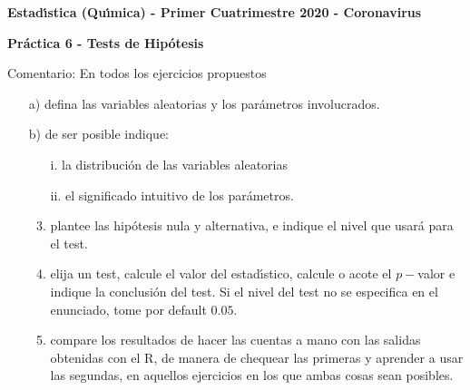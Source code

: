 \documentclass[11pt,a4paper,twoside]{article}%
\begin{document}
\begin{center}
\textbf{\textsf{Estad\'{\i}stica (Qu\'{\i}mica) - Primer Cuatrimestre 2020 - Coronavirus}}

\textbf{Pr\'{a}ctica 6 - Tests de Hip\'{o}tesis}
\end{center}

Comentario: En todos los ejercicios propuestos

\begin{enumerate}
\item[a)] defina las variables aleatorias y los par\'{a}metros involucrados.

\item[b)] de ser posible indique:

\begin{enumerate}
\item[i.] la distribuci\'{o}n de las variables aleatorias

\item[ii.] el significado intuitivo de los par\'{a}metros.

\item plantee las hip\'{o}tesis nula y alternativa, e indique el nivel que
usar\'{a} para el test.

\item elija un test, calcule el valor del estad\'{\i}stico, calcule o acote el
$p-$valor e indique la conclusi\'{o}n del test. Si el nivel del test no se
especifica en el enunciado, tome por default $0.05$.

\item compare los resultados de hacer las cuentas a mano con las salidas
obtenidas con el R, de manera de chequear las primeras y aprender a usar las
segundas, en aquellos ejercicios en los que ambas cosas sean posibles.
\end{enumerate}
\end{enumerate}
\end{document}
